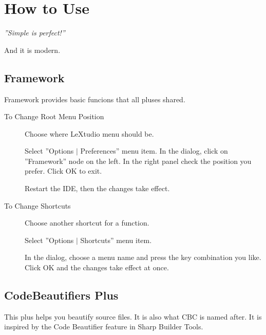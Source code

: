 \chapter{How to Use}
\emph{''Simple is perfect!''}

And it is modern.
\label{cha:commonusage}

\piccbc \newpage

\section{Framework}

Framework provides basic funcions that all pluses shared.

\begin{description}

\item[To Change Root Menu Position] Choose where LeXtudio menu should be.

Select ''Options $|$ Preferences'' menu item. In the dialog, click on
''Framework'' node on the left. In the right panel check the position you
prefer. Click OK to exit.


Restart the IDE, then the changes take effect.

\item[To Change Shortcuts] Choose another shortcut for a function.

Select ''Options $|$ Shortcuts'' menu item.


In the dialog, choose a menu name and press the key combination you like. Click
OK and the changes take effect at once.

\end{description}


\section{CodeBeautifiers Plus}

This plus helps you beautify source files. It is also what CBC is named after.
It is inspired by the Code Beautifier feature in Sharp Builder Tools.

